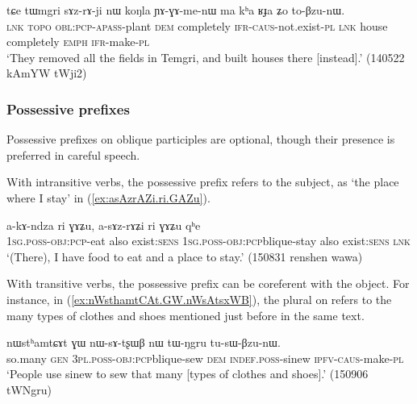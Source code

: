 \begin{exe}
\ex \label{ex:sAZrAji}
\gll  tɕe tɯmgri sɤz-rɤ-ji nɯ koŋla ɲɤ-ɣɤ-me-nɯ ma kʰa ʁɟa ʑo to-βzu-nɯ. \\
\textsc{lnk}  \textsc{topo} \textsc{obl}:\textsc{pcp}-\textsc{apass}-plant \textsc{dem} completely \textsc{ifr}-\textsc{caus}-not.exist-\textsc{pl} \textsc{lnk} house completely \textsc{emph} \textsc{ifr}-make-\textsc{pl} \\
\glt `They removed all the fields in Temgri, and built houses there [instead].' (140522 kAmYW tWji2) 	
\end{exe}

 \subsubsection{Possessive prefixes} \label{sec:oblique.participle.possessive}
Possessive prefixes on oblique participles are optional, though their presence is preferred in careful speech.

With intransitive verbs, the possessive prefix refers to the subject, as  `the place where I stay' in (\ref{ex:asAzrAZi.ri.GAZu}).

\begin{exe}
\ex \label{ex:asAzrAZi.ri.GAZu}
\gll a-kɤ-ndza ri ɣɤʑu, a-sɤz-rɤʑi ri ɣɤʑu qʰe \\
\textsc{1sg}.\textsc{poss}-\textsc{obj}:\textsc{pcp}-eat also exist:\textsc{sens} \textsc{1sg}.\textsc{poss}-\textsc{obj}:\textsc{pcp}blique-stay also exist:\textsc{sens} \textsc{lnk} \\
\glt `(There), I have food to eat and a place to stay.' (150831 renshen wawa) 
\end{exe}

With transitive verbs, the possessive prefix can be coreferent with the object. For instance, in (\ref{ex:nWsthamtCAt.GW.nWsAtsxWB}), the plural  on  refers to the many types of clothes and shoes mentioned just before in the same text.

 \begin{exe}
\ex \label{ex:nWsthamtCAt.GW.nWsAtsxWB}
\gll nɯstʰamtɕɤt ɣɯ nɯ-sɤ-tʂɯβ nɯ tɯ-ŋgru tu-sɯ-βzu-nɯ.   \\
so.many \textsc{gen} \textsc{3pl}.\textsc{poss}-\textsc{obj}:\textsc{pcp}blique-sew \textsc{dem} \textsc{indef}.\textsc{poss}-sinew \textsc{ipfv}-\textsc{caus}-make-\textsc{pl} \\
\glt `People use sinew to sew that many [types of clothes and shoes].' (150906 tWNgru) 
\end{exe} 

